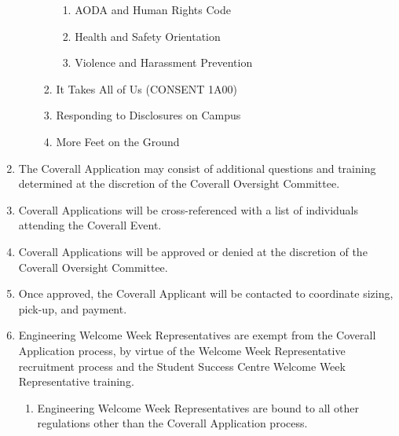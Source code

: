 \begin{enumerate}
\begin{enumerate}
\begin{enumerate}
      \begin{enumerate}
       \item
        AODA and Human Rights Code
       \item
        Health and Safety Orientation
       \item
        Violence and Harassment Prevention
      \end{enumerate}
     \item
      It Takes All of Us (CONSENT 1A00)
     \item
      Responding to Disclosures on Campus
     \item
      More Feet on the Ground
    \end{enumerate}
  \end{enumerate}
 \item
  The Coverall Application may consist of additional questions and training determined at the discretion of the Coverall Oversight Committee.
 \item
  Coverall Applications will be cross-referenced with a list of individuals attending the Coverall Event.
 \item
  Coverall Applications will be approved or denied at the discretion of the Coverall Oversight Committee.
 \item
  Once approved, the Coverall Applicant will be contacted to coordinate sizing, pick-up, and payment.
 \item
  Engineering Welcome Week Representatives are exempt from the Coverall Application process, by virtue of the Welcome Week Representative recruitment process and the Student Success Centre Welcome Week Representative training.
  \begin{enumerate}
   \item
    Engineering Welcome Week Representatives are bound to all other regulations other than the Coverall Application process.
  \end{enumerate}
\end{enumerate}

